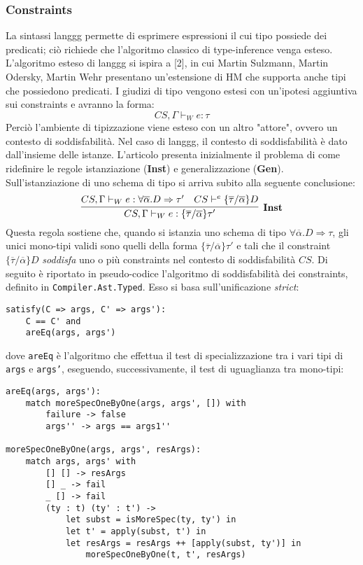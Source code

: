 \documentclass[10pt,a4paper]{article}
\begin{document}
\subsubsection{Constraints}
La sintassi langgg permette di esprimere espressioni il cui tipo possiede dei predicati; ciò richiede che l'algoritmo
classico di type-inference venga esteso. L'algoritmo esteso di langgg si ispira a [2], in cui Martin Sulzmann,
Martin Odersky, Martin Wehr presentano un'estensione di HM che supporta anche tipi che possiedono predicati. I giudizi
di tipo vengono estesi con un'ipotesi aggiuntiva sui constraints e avranno la forma:
\[ CS, \Gamma \vdash_W e : \tau \]
Perciò l'ambiente di tipizzazione viene esteso con un altro "attore", ovvero un contesto di soddisfabilità. Nel caso
di langgg, il contesto di soddisfabilità è dato dall'insieme delle istanze.
L'articolo presenta inizialmente il problema di come ridefinire le regole istanziazione (\textbf{Inst}) e generalizzazione
(\textbf{Gen}). Sull'istanziazione di uno schema di tipo si arriva subito alla seguente conclusione:
\[ \infer[\textbf{Inst}]{CS, \Gamma \vdash_W e : \{ \overline{\tau} / \overline{\alpha} \}\tau'}{CS, \Gamma \vdash_W e : \forall \overline{\alpha}. D \Rightarrow \tau' & CS \vdash^e \{ \overline{\tau} / \overline{\alpha} \} D} \]
Questa regola sostiene che, quando si istanzia uno schema di tipo $ \forall \overline{\alpha}. D \Rightarrow \tau $, gli
unici mono-tipi validi sono quelli della forma $ \{ \overline{\tau} / \overline{\alpha} \} \tau' $ e tali che il constraint
$ \{ \overline{\tau} / \overline{\alpha} \}D $ \textit{soddisfa} uno o più constraints nel contesto di soddisfabilità $ CS $.
Di seguito è riportato in pseudo-codice l'algoritmo di soddisfabilità dei constraints, definito in
\texttt{Compiler.Ast.Typed}. Esso si basa sull'unificazione \textit{strict}:
\begin{lstlisting}
satisfy(C => args, C' => args'):
    C == C' and
    areEq(args, args')
\end{lstlisting}
dove \texttt{areEq} è l'algoritmo che effettua il test di specializzazione tra i vari tipi di \texttt{args}
e \texttt{args'}, eseguendo, successivamente, il test di uguaglianza tra mono-tipi:
\begin{lstlisting}
areEq(args, args'):
    match moreSpecOneByOne(args, args', []) with
        failure -> false
        args'' -> args == args1''

moreSpecOneByOne(args, args', resArgs):
    match args, args' with
        [] [] -> resArgs
        [] _ -> fail
        _ [] -> fail
        (ty : t) (ty' : t') ->
            let subst = isMoreSpec(ty, ty') in
            let t' = apply(subst, t') in
            let resArgs = resArgs ++ [apply(subst, ty')] in
                moreSpecOneByOne(t, t', resArgs)
\end{lstlisting}
\end{document}
